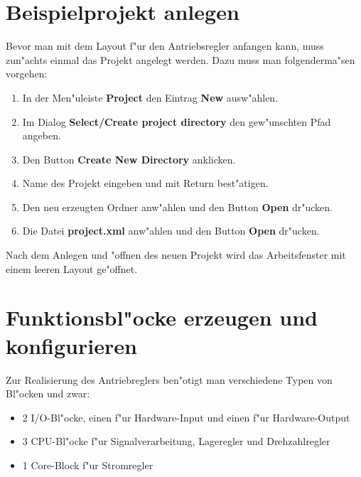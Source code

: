 \section {Beispielprojekt  anlegen}
Bevor man mit dem Layout f"ur den Antriebsregler anfangen kann, muss zun"achts einmal das Projekt angelegt werden. Dazu muss man folgenderma"sen vorgehen:
\begin{enumerate}
	\item In der Men"uleiste {\bf Project} den Eintrag {\bf New} ausw"ahlen.
	\item Im Dialog {\bf Select/Create project directory} den gew"unschten Pfad angeben.
	\item Den Button {\bf Create New Directory} anklicken.
	\item Name des Projekt eingeben und mit Return best"atigen.
	\item Den neu erzeugten Ordner anw"ahlen und den Button {\bf Open} dr"ucken.
	\item Die Datei {\bf project.xml} anw"ahlen und den Button {\bf Open} dr"ucken.
\end{enumerate}
Nach dem Anlegen und "offnen des neuen Projekt wird das Arbeitsfenster mit einem leeren Layout ge"offnet.
\section{Funktionsbl"ocke erzeugen und konfigurieren}
Zur Realisierung des Antriebreglers ben"otigt man verschiedene Typen von Bl"ocken und zwar:
\begin{itemize}
	\item 2 I/O-Bl"ocke, einen f"ur Hardware-Input und einen f"ur Hardware-Output
	\item 3 CPU-Bl"ocke f"ur Signalverarbeitung, Lageregler und Drehzahlregler
	\item 1 Core-Block f"ur Stromregler
\end{itemize}
